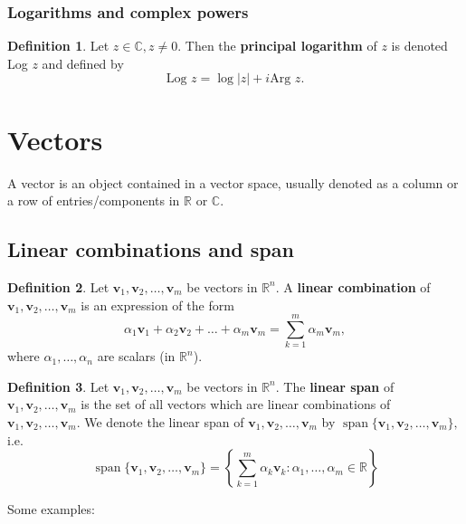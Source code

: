 \documentclass[12pt, a4paper]{article}
\theoremstyle{definition}
\newtheorem{definition}{Definition}[section]
\theoremstyle{plain}
\newcommand{\bb}[1]{\mathbb{#1}}
\newcommand{\vect}[1]{\mathbf{#1}}
\DeclareMathOperator{\Span}{span}
\begin{document}
\subsubsection{Logarithms and complex powers}

\begin{definition} Let $z \in \bb{C}, z \neq 0.$ Then the \textbf{principal logarithm} of $z$ is denoted Log $z$ and defined by $$\text{Log }z = \log{|z|}+i\text{Arg }z.$$ \end{definition}
 
\section{Vectors}

A vector is an object contained in a vector space, usually denoted as a column or a row of entries/components in $\bb{R}$ or $\bb{C}.$

\subsection{Linear combinations and span}

\begin{definition} Let $\vect{v}_1,\vect{v}_2,\ldots,\vect{v}_m$ be vectors in $\bb{R}^n.$ A \textbf{linear combination} of $\vect{v}_1,\vect{v}_2,\ldots,\vect{v}_m$ is an expression of the form $$\alpha_1\vect{v}_1+\alpha_2\vect{v}_2+\ldots+\alpha_m\vect{v}_m=\sum_{k=1}^{m} \alpha_m\vect{v}_m,$$ where $\alpha_1,\ldots,\alpha_n$ are scalars (in $\bb{R}^n$). \end{definition}

\begin{definition} Let $\vect{v}_1,\vect{v}_2,\ldots,\vect{v}_m$ be vectors in $\bb{R}^n.$ The \textbf{linear span} of $\vect{v}_1,\vect{v}_2,\ldots,\vect{v}_m$ is the set of all vectors which are linear combinations of $\vect{v}_1,\vect{v}_2,\ldots,\vect{v}_m.$ We denote the linear span of $\vect{v}_1,\vect{v}_2,\ldots,\vect{v}_m$ by $\Span\{\vect{v}_1,\vect{v}_2,\ldots,\vect{v}_m\},$ i.e. $$\Span\{\vect{v}_1,\vect{v}_2,\ldots,\vect{v}_m\} = \left\{\sum_{k=1}^{m} \alpha_k\vect{v}_k : \alpha_1,\ldots,\alpha_m \in \bb{R}\right\}$$ \end{definition} 

Some examples:
\end{document}
